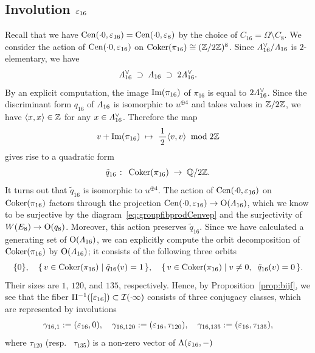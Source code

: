\documentclass{amsart} %
\begin{document}
\subsection{Involution $\varepsilon_{16}$}\label{subsec:vep16}
%
Recall that  we have $\mathrm{Cen}(\cdot 0, \varepsilon_{16})=\mathrm{Cen}(\cdot 0, \varepsilon_{8})$
by  the choice of $C_{16}=\Omega\setminus C_8$.
We consider the action of  $\mathrm{Cen}(\cdot 0, \varepsilon_{16})$
on $\operatorname{Coker}(\pi_{16})\cong (\mathord{\mathbb{Z}}/2\mathord{\mathbb{Z}})^8$.
Since $\varLambda_{16}^{\vee}/\varLambda_{16}$ 
is $2$-elementary,
we have
%
\begin{equation} \label{eq:filteration}
\varLambda_{16}^{\vee} \;\supset\; \varLambda_{16}\; \supset \;  2\varLambda_{16}^{\vee}.
\end{equation}
%
By an explicit computation,
the image $\operatorname{Im}(\pi_{16})$ of $\pi_{16}$ is equal to $2\varLambda_{16}^{\vee}$.
Since  the discriminant form $q_{16}$ of $\varLambda_{16}$ 
is isomorphic to $u^{\oplus 4}$ and  takes values in $\mathord{\mathbb{Z}}/2\mathord{\mathbb{Z}}$,
we have $\langle x, x \rangle\in \mathord{\mathbb{Z}}$ for any $x\in \varLambda_{16}^{\vee}$.
Therefore the map
\[
v+\operatorname{Im} (\pi_{16}) \;\mapsto\; \frac{\,1\,}{2} \langle v, v \rangle \;\bmod 2\mathord{\mathbb{Z}}
\]
gives rise to a quadratic  form 
\[
\tilde{q}_{16}\;\colon\;  \operatorname{Coker} (\pi_{16})\;\to\; \mathord{\mathbb{Q}}/2\mathord{\mathbb{Z}}.
 \]
It turns out that $\tilde{q}_{16}$ is isomorphic to $u^{\oplus 4}$.
The action of $\mathrm{Cen}(\cdot 0, \varepsilon_{16})$ on $\operatorname{Coker} (\pi_{16})$ 
factors through the projection
$\mathrm{Cen}(\cdot 0, \varepsilon_{16})\to \mathord{\mathrm{O}}(\varLambda_{16})$,
which we know to be surjective
by the diagram~\eqref{eq:groupfibprodCenvep} and the surjectivity of 
$W(E_8)\to \mathord{\mathrm{O}}(q_8)$. 
Moreover,  this action 
preserves $\tilde{q}_{16}$.
Since we have calculated a generating set of $\mathord{\mathrm{O}}(\varLambda_{16})$,
we can explicitly compute the orbit decomposition of $\operatorname{Coker} (\pi_{16})$
by $\mathord{\mathrm{O}}(\varLambda_{16})$; it consists of the following three orbits 
\[
\{0\},\quad 
\{\,{v \in\operatorname{Coker} (\pi_{16}) }\mid {\tilde{q}_{16}(v)=1} \,\},
\quad
\{\,{v \in\operatorname{Coker} (\pi_{16}) }\mid {v\ne 0, \;\; \tilde{q}_{16}(v)=0} \,\}.
\]
Their sizes are $1$, $120$,  and $135$, respectively.
Hence, by Proposition~\ref{prop:bijf},  
 we see that the fiber $\Pi^{-1} ([\varepsilon_{16}])\subset \mathord{\mathcal{I}}(\cdot \infty)$  consists of three conjugacy classes,
 which are 
 represented  by  involutions
 \[
 \gamma_{16, 1}:=(\varepsilon_{16}, 0),
 \quad
  \gamma_{16, 120}:=(\varepsilon_{16}, \tau_{120}),
  \quad
   \gamma_{16, 135}:=(\varepsilon_{16}, \tau_{135}),
 \]
where $ \tau_{120}$ (resp. ~$\tau_{135}$) is a non-zero vector of $\Lambda(\varepsilon_{16}, -)$ 
\end{document}
